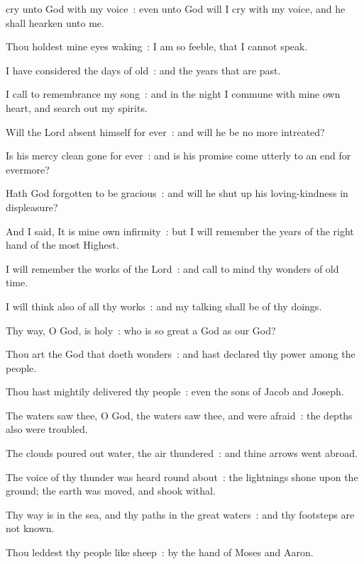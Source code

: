  cry unto God with my voice~: even unto God will I cry with my voice, and he shall hearken unto me.\par
{}
Thou holdest mine eyes waking~: I am so feeble, that I cannot speak.\par
{}I have considered the days of old~: and the years that are past.\par
{}I call to remembrance my song~: and in the night I commune with mine own heart, and search out my spirits.\par
{}Will the Lord absent himself for ever~: and will he be no more intreated?\par
{}Is his mercy clean gone for ever~: and is his promise come utterly to an end for evermore?\par
{}Hath God forgotten to be gracious~: and will he shut up his loving-kindness in displeasure?\par
{}And I said, It is mine own infirmity~: but I will remember the years of the right hand of the most Highest.\par
{}I will remember the works of the Lord~: and call to mind thy wonders of old time.\par
{}I will think also of all thy works~: and my talking shall be of thy doings.\par
{}Thy way, O God, is holy~: who is so great a God as our God?\par
{}Thou art the God that doeth wonders~: and hast declared thy power among the people.\par
{}Thou hast mightily delivered thy people~: even the sons of Jacob and Joseph.\par
{}The waters saw thee, O God, the waters saw thee, and were afraid~: the depths also were troubled.\par
{}The clouds poured out water, the air thundered~: and thine arrows went abroad.\par
{}The voice of thy thunder was heard round about~: the lightnings shone upon the ground; the earth was moved, and shook withal.\par
{}Thy way is in the sea, and thy paths in the great waters~: and thy footsteps are not known.\par
{}Thou leddest thy people like sheep~: by the hand of Moses and Aaron.\par

